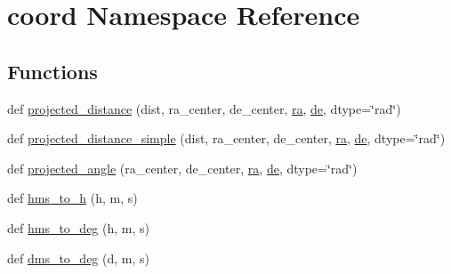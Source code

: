 \hypertarget{namespacecoord}{}\section{coord Namespace Reference}
\label{namespacecoord}
\subsection*{Functions}
\begin{DoxyCompactItemize}
\item 
def \hyperlink{namespacecoord_a46aebc3089e078f4597812fecdd0975f}{projected\+\_\+distance} (dist, ra\+\_\+center, de\+\_\+center, \hyperlink{namespacecoord_a9e8cb473ba5d9c7398020447b51174e0}{ra}, \hyperlink{namespacecoord_a8dcc8c73e25f42279ad5b38825c9b285}{de}, dtype=\char`\"{}rad\char`\"{})
\item 
def \hyperlink{namespacecoord_a6cca1fe4ad65d56023a02550cbba8ce8}{projected\+\_\+distance\+\_\+simple} (dist, ra\+\_\+center, de\+\_\+center, \hyperlink{namespacecoord_a9e8cb473ba5d9c7398020447b51174e0}{ra}, \hyperlink{namespacecoord_a8dcc8c73e25f42279ad5b38825c9b285}{de}, dtype=\char`\"{}rad\char`\"{})
\item 
def \hyperlink{namespacecoord_a04a9b47f67924315930327ed806ee648}{projected\+\_\+angle} (ra\+\_\+center, de\+\_\+center, \hyperlink{namespacecoord_a9e8cb473ba5d9c7398020447b51174e0}{ra}, \hyperlink{namespacecoord_a8dcc8c73e25f42279ad5b38825c9b285}{de}, dtype=\char`\"{}rad\char`\"{})
\item 
def \hyperlink{namespacecoord_a07f644bbf8451a0560cf4b4966049ab0}{hms\+\_\+to\+\_\+h} (h, m, s)
\item 
def \hyperlink{namespacecoord_ac3ec31a56901971ab03a578d64030901}{hms\+\_\+to\+\_\+deg} (h, m, s)
\item 
def \hyperlink{namespacecoord_af5e3e51606e1533306ebbad1e67d0b17}{dms\+\_\+to\+\_\+deg} (d, m, s)
\end{DoxyCompactItemize}

